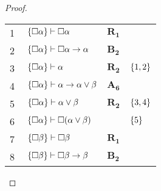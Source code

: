 \begin{tcolorbox}[enhanced jigsaw, breakable, sharp corners, colframe=black, colback=white, boxrule=0.5pt, left=1.5mm, right=1.5mm, top=1.5mm, bottom=1.5mm]
\begin{lemma}
\begin{proof}
        \vspace{0.5\baselineskip}
        \footnotesize
        \setlength{\rowskip}{0.5\baselineskip}
        \begin{xltabular}{\textwidth}{r | X l l}
            \scriptsize{\phantom{0}1}\phantom{ } & $\ \set{\nec\alpha}\vdash\nec\alpha$                                                                                                   & $\hyperref[modal.rule.1]{\mathbf{R_1}}$        & \\[\rowskip]
            \scriptsize{\phantom{0}2}\phantom{ } & $\ \set{\nec\alpha}\vdash\nec\alpha\to\alpha$                                                                                          & $\hyperref[modal.axiom.modal.2]{\mathbf{B_2}}$ & \\[\rowskip]
            \scriptsize{\phantom{0}3}\phantom{ } & $\ \set{\nec\alpha}\vdash\alpha$                                                                                                       & $\hyperref[modal.rule.2]{\mathbf{R_2}}$        & $\left\{1,2\right\}$\\[\rowskip]
            \scriptsize{\phantom{0}4}\phantom{ } & $\ \set{\nec\alpha}\vdash\alpha\to\alpha\vee\beta$                                                                                     & $\hyperref[modal.axiom.6]{\mathbf{A_6}}$       & \\[\rowskip]
            \scriptsize{\phantom{0}5}\phantom{ } & $\ \set{\nec\alpha}\vdash\alpha\vee\beta$                                                                                              & $\hyperref[modal.rule.2]{\mathbf{R_2}}$        & $\left\{3,4\right\}$\\[\rowskip]
            \scriptsize{\phantom{0}6}\phantom{ } & $\ \set{\nec\alpha}\vdash\nec(\alpha\vee\beta)$                                                                                        &                       & $\left\{5\right\}$\\[\rowskip]
            \scriptsize{\phantom{0}7}\phantom{ } & $\ \set{\nec\beta}\vdash\nec\beta$                                                                                                     & $\hyperref[modal.rule.1]{\mathbf{R_1}}$        & \\[\rowskip]
            \scriptsize{\phantom{0}8}\phantom{ } & $\ \set{\nec\beta}\vdash\nec\beta \to \beta$                                                                                           & $\hyperref[modal.axiom.modal.2]{\mathbf{B_2}}$ & \\[\rowskip]

\end{xltabular}
\end{proof}
\end{lemma}
\end{tcolorbox}

